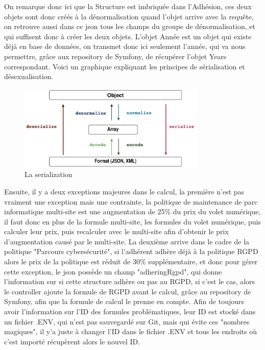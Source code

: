 \documentclass[a4paper,12pt]{report}
\begin{document}
On remarque donc ici que la Structure est imbriquée dans l'Adhésion, ces deux objets sont donc créés à la dénormalisation quand l'objet arrive avec la requête, on retrouve aussi dans ce json tous les champs du groupe de dénormalisation, et qui suffisent donc à créer les deux objets. L'objet Année est un objet qui existe déjà en base de données, on transmet donc ici seulement l'année, qui va nous permettre, grâce aux repository de Symfony, de récupérer l'objet Years correspondant. Voici un graphique expliquant les principes de sérialisation et désexualisation.

\begin{figure}[h]
    \centering
    \includegraphics[width=0.8\textwidth]{SerializerWorkflow.png}
    \caption{La serialization}
    \label{fig:serialization}
\end{figure}

Ensuite, il y a deux exceptions majeures dans le calcul, la première n'est pas vraiment une exception mais une contrainte, la politique de maintenance de parc informatique multi-site est une augmentation de 25\% du prix du volet numérique, il faut donc en plus de la formule multi-site, les formules du volet numérique, puis calculer leur prix, puis recalculer avec le multi-site afin d'obtenir le prix d'augmentation causé par le multi-site. La deuxième arrive dans le cadre de la politique "Parcours cybersécurité", si l'adhérent adhère déjà à la politique RGPD alors le prix de la politique est réduit de 30\% supplémentaire, et donc pour gérer cette exception, le json possède un champ "adheringRgpd", qui donne l'information sur si cette structure adhère ou pas au RGPD, si c'est le cas, alors le controller ajoute la formule de RGPD avant le calcul, grâce au repository de Symfony, afin que la formule de calcul le prenne en compte. Afin de toujours avoir l'information sur l'ID des formules problématiques, leur ID est stocké dans un fichier .ENV, qui n'est pas sauvegardé sur Git, mais qui évite ces "nombres magiques", il y'a juste à changer l'ID dans le fichier .ENV et tous les endroits où c'est importé récupèrent alors le nouvel ID.
\end{document}
